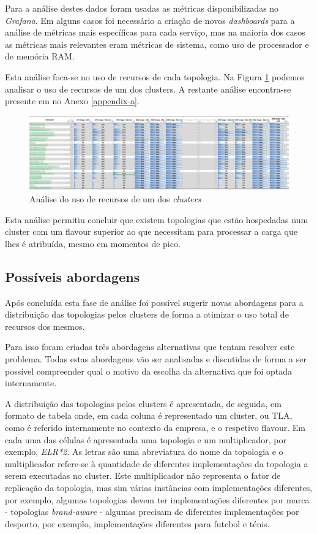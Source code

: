 Para a análise destes dados foram usadas as métricas disponibilizadas no \textit{Grafana}. Em alguns
casos foi necessário a criação de novos \textit{dashboards} para a análise de métricas mais 
específicas para cada serviço, mas na maioria dos casos as métricas mais relevantes eram métricas 
de sistema, como uso de processador e de memória RAM.

Esta análise foca-se no uso de recursos de cada topologia. Na Figura \ref{analise-ofs} podemos
analisar o uso de recursos de um dos \glspl{cluster}. A restante análise encontra-se
presente em no Anexo \ref{appendix-a}.

\begin{figure}[H]
  \centerline{\includegraphics[scale=0.25]{media/content/analise/analise-ofs.png}}
  \caption{Análise do uso de recursos de um dos \textit{clusters}}
  \label{analise-ofs}
\end{figure}

Esta análise permitiu concluir que existem topologias que estão hospedadas num \gls{cluster}
com um \gls{flavour} superior ao que necessitam para processar a carga que lhes é atribuída,
mesmo em momentos de pico. 

\subsection{Possíveis abordagens}

Após concluída esta fase de análise foi possível sugerir novas abordagens para a distribuição
das topologias pelos \glspl{cluster} de forma a otimizar o uso total de recursos dos mesmos.

Para isso foram criadas três abordagens alternativas que tentam resolver este problema. Todas estas
abordagens vão ser analisadas e discutidas de forma a ser possível compreender qual o motivo da
escolha da alternativa que foi optada internamente.

A distribuição das topologias pelos \glspl{cluster} é apresentada, de seguida, em formato de 
tabela onde, em cada coluna é representado um \gls{cluster}, ou \ac{TLA}, como é referido 
internamente no contexto da empresa, e o respetivo \gls{flavour}. Em cada uma das células é
apresentada uma topologia e um multiplicador, por exemplo, \textit{ELR*2}. As letras são uma 
abreviatura do nome da topologia e o multiplicador refere-se à quantidade de diferentes
implementações da topologia a serem executadas no \gls{cluster}. Este multiplicador não representa
o fator de replicação da topologia, mas sim várias instâncias com implementações diferentes, por
exemplo, algumas topologias devem ter implementações diferentes por marca - topologias
\textit{brand-aware} - algumas precisam de diferentes implementações por desporto, por exemplo,
implementações diferentes para futebol e ténis.

